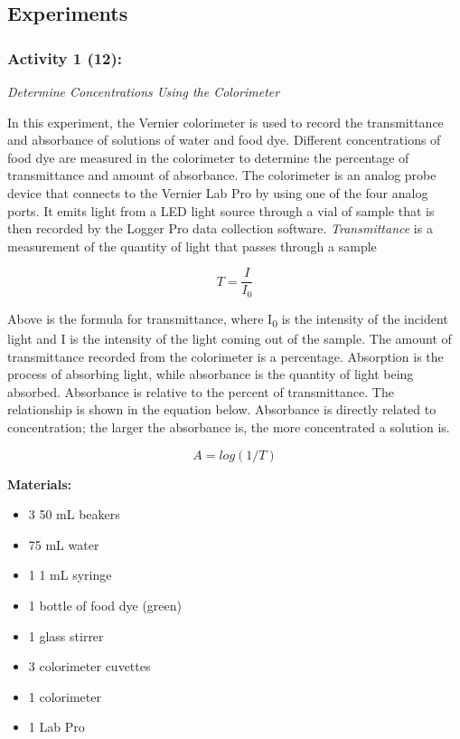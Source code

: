 \documentclass[11.5pt]{sig-alternate} %
\begin{document}
\begin{large}
\subsection*{Experiments}

\subsubsection*{Activity 1 (12):}

\textit{Determine Concentrations Using the Colorimeter}

In this experiment, the Vernier colorimeter is used to record the transmittance and absorbance of solutions of water and food dye. Different concentrations of food dye are measured in the colorimeter to determine the percentage of transmittance and amount of absorbance. The colorimeter is an analog probe device that connects to the Vernier Lab Pro by using one of the four analog ports. It emits light from a LED light source through a vial of sample that is then recorded by the Logger Pro data collection software. \textit{Transmittance} is a measurement of the quantity of light that passes through a sample

\[T = \frac{I}{I_{0}}\]

Above is the formula for transmittance, where I\textsubscript{0} is the intensity of the incident light and I is the intensity of the light coming out of the sample. The amount of transmittance recorded from the colorimeter is a percentage. Absorption is the process of absorbing light, while absorbance is the quantity of light being absorbed. Absorbance is relative to the percent of transmittance. The relationship is shown in the equation below. Absorbance is directly related to concentration; the larger the absorbance is, the more concentrated a solution is. 

\[A = log(1/T)\]

\textbf{Materials:}
\begin{itemize}
    \item  3 50 mL beakers
    \item  75 mL water
    \item  1 1 mL syringe
    \item  1 bottle of food dye (green)
    \item  1 glass stirrer
    \item  3 colorimeter cuvettes
    \item  1 colorimeter
    \item  1 Lab Pro
\end{itemize}


\end{large}
\end{document}
